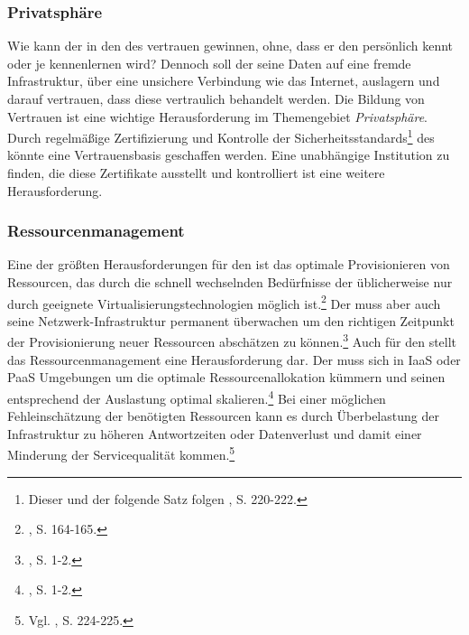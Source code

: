 \subsubsection{Privatsphäre}
Wie kann der \CSU in den \CS des \CSPs vertrauen gewinnen, ohne, dass er den \CSP persönlich kennt oder je kennenlernen wird? Dennoch soll der \CSU seine Daten auf eine fremde Infrastruktur, über eine unsichere Verbindung wie das Internet, auslagern und darauf vertrauen, dass diese vertraulich behandelt werden. Die Bildung von Vertrauen ist eine wichtige Herausforderung im Themengebiet \emph{Privatsphäre}. 
\newline
Durch regelmäßige Zertifizierung und Kontrolle der Sicherheitsstandards\footnote{Dieser und der folgende Satz folgen \cite{Wang.2012}, S. 220-222.} des \CSPs könnte eine Vertrauensbasis geschaffen werden. Eine unabhängige Institution zu finden, die diese Zertifikate ausstellt und kontrolliert ist eine weitere Herausforderung.

\subsubsection{Ressourcenmanagement}
Eine der größten Herausforderungen für den \CSP ist das optimale Provisionieren von Ressourcen, das durch die schnell wechselnden Bedürfnisse der \CSU üblicherweise nur durch geeignete Virtualisierungstechnologien möglich ist.\footnote{\cite{Chaisiri.2012}, S. 164-165.} 
Der \CSP muss aber auch seine Netzwerk-Infrastruktur permanent überwachen um den richtigen Zeitpunkt der Provisionierung neuer Ressourcen abschätzen zu können.\footnote{\cite{Meng.2012}, S. 1-2.}
\newline
Auch für den \CSU stellt das Ressourcenmanagement eine Herausforderung dar. 
Der \CSU muss sich in \acs{IaaS} oder \acs{PaaS} Umgebungen um die optimale Ressourcenallokation kümmern und seinen \CS entsprechend der Auslastung optimal skalieren.\footnote{\cite{Papagianni.2013}, S. 1-2.} Bei einer möglichen Fehleinschätzung der benötigten Ressourcen kann es durch Überbelastung der Infrastruktur zu höheren Antwortzeiten oder Datenverlust und damit einer Minderung der Servicequalität kommen.\footnote{Vgl. \cite{Wang.2012}, S. 224-225.}


